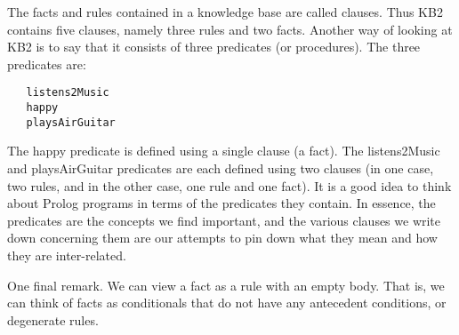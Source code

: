 The facts and rules contained in a knowledge base are called clauses. Thus KB2
contains five clauses, namely three rules and two facts. Another way of looking
at KB2 is to say that it consists of three predicates (or procedures). The three
predicates are:

\begin{verbatim} 
   listens2Music 
   happy 
   playsAirGuitar
\end{verbatim}
The happy predicate is defined using a single clause (a fact). The listens2Music
and playsAirGuitar predicates are each defined using two clauses (in one case,
two rules, and in the other case, one rule and one fact). It is a good idea to
think about Prolog programs in terms of the predicates they contain. In essence,
the predicates are the concepts we find important, and the various clauses we
write down concerning them are our attempts to pin down what they mean and how
they are inter-related.

One final remark. We can view a fact as a rule with an empty body. That is, we
can think of facts as conditionals that do not have any antecedent conditions,
or degenerate rules.   
 
\secup
